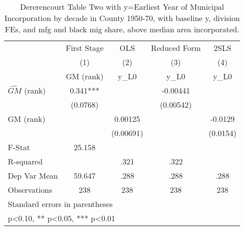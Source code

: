 \begin{table}[htbp]\centering
\def\sym#1{\ifmmode^{#1}\else\(^{#1}\)\fi}
\caption{Dererencourt Table Two with y=Earliest Year of Municipal Incorporation by decade in County 1950-70, with baseline y, division FEs, and mfg and black mig share, above median area incorporated.}
\begin{tabular}{l*{4}{c}}
\toprule
                    & First Stage   &         OLS   &Reduced Form   &        2SLS   \\
                    &\multicolumn{1}{c}{(1)}&\multicolumn{1}{c}{(2)}&\multicolumn{1}{c}{(3)}&\multicolumn{1}{c}{(4)}\\
                    &\multicolumn{1}{c}{GM  (rank)}&\multicolumn{1}{c}{y\_L0}&\multicolumn{1}{c}{y\_L0}&\multicolumn{1}{c}{y\_L0}\\
\midrule
$\hat{GM}$ (rank)   &       0.341***&               &    -0.00441   &               \\
                    &    (0.0768)   &               &   (0.00542)   &               \\
\addlinespace
GM  (rank)          &               &     0.00125   &               &     -0.0129   \\
                    &               &   (0.00691)   &               &    (0.0154)   \\
\midrule
F-Stat              &      25.158   &               &               &               \\
R-squared           &               &        .321   &        .322   &               \\
Dep Var Mean        &      59.647   &        .288   &        .288   &        .288   \\
Observations        &         238   &         238   &         238   &         238   \\
\bottomrule
\multicolumn{5}{l}{\footnotesize Standard errors in parentheses}\\
\multicolumn{5}{l}{\footnotesize * p<0.10, ** p<0.05, *** p<0.01}\\
\end{tabular}
\end{table}
